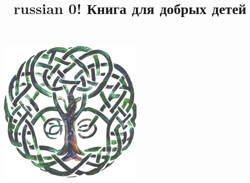\documentclass[a5paper,11pt]{memoir}
\title{\begin{otherlanguage*}{russian}
0! Книга для добрых детей
\end{otherlanguage*}}
\author{}
\begin{document}

\date{} %
\maketitle
\begin{center}
\includegraphics[height=7cm]{images/tree-cover} 
\end{center}
\thispagestyle{empty}
\newpage
\thispagestyle{empty}  %


\clearpage
\hfill
\end{document}
